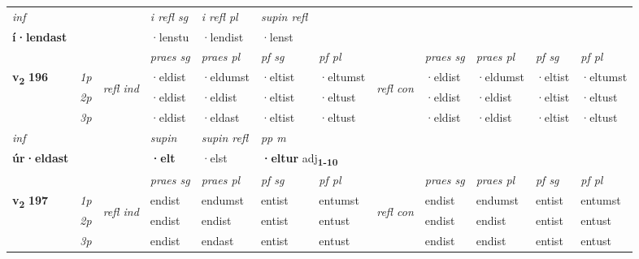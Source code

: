 \begin{longtable}[l]{X>{\footnotesize\itshape}llXXXXlXXXX}
   {\textit{inf}} & &   & \textit{i refl sg} & \textit{i refl pl}   & \textit{supin refl}  \\*
  {\textbf{í\allowbreak ·lendast}} & &   & ·lenstu & ·lendist   & ·lenst  \\*

\midrule

 & &   & \textit{praes sg}  & \textit{praes pl}    & \textit{ pf sg} & \textit{pf pl} & & \textit{praes sg}  & \textit{praes pl}    & \textit{pf sg} & \textit{pf pl }  \\ \cmidrule{4-7} \cmidrule{9-12}
 \multirow{2}{*}{{{\textbf{v{\textsubscript{2}}} \Large{\textbf{196}}}}}  & 1p & \multirow{3}{*}{\begin{turn}{90}\textit{refl ind}\end{turn}}  & ·eldist & ·eldumst & ·eltist & ·eltumst & \multirow{3}{*}{\begin{turn}{90}\textit{refl con}\end{turn}}  &·eldist & ·eldumst & ·eltist & ·eltumst \\*
 & 2p &  & ·eldist & ·eldist & ·eltist & ·eltust & &·eldist & ·eldist & ·eltist & ·eltust \\*
 & 3p  & & ·eldist & ·eldast & ·eltist & ·eltust & & ·eldist & ·eldist& ·eltist & ·eltust \\*
\cmidrule{4-7} \cmidrule{9-12}

   {\textit{inf}} & &      & \textit{supin} & \textit{supin refl} & \textit{pp m} \\*
  {\textbf{úr\allowbreak ·eldast}} & &      &  \textbf{·elt} & ·elst & \multicolumn{2}{l}{\textbf{·eltur} adj\textbf{\textsubscript{1-10}}} \\*

\midrule

 & &   & \textit{praes sg}  & \textit{praes pl}    & \textit{ pf sg} & \textit{pf pl} & & \textit{praes sg}  & \textit{praes pl}    & \textit{pf sg} & \textit{pf pl }  \\ \cmidrule{4-7} \cmidrule{9-12}
 \multirow{2}{*}{{{\textbf{v{\textsubscript{2}}} \Large{\textbf{197}}}}}  & 1p & \multirow{3}{*}{\begin{turn}{90}\textit{refl ind}\end{turn}}  & endist & endumst & entist & entumst & \multirow{3}{*}{\begin{turn}{90}\textit{refl con}\end{turn}}  &endist & endumst & entist & entumst \\*
 & 2p &  & endist & endist & entist & entust & &endist & endist & entist & entust \\*
 & 3p  & & endist & endast & entist & entust & & endist & endist& entist & entust \\*
\cmidrule{4-7} \cmidrule{9-12}


\end{longtable}
